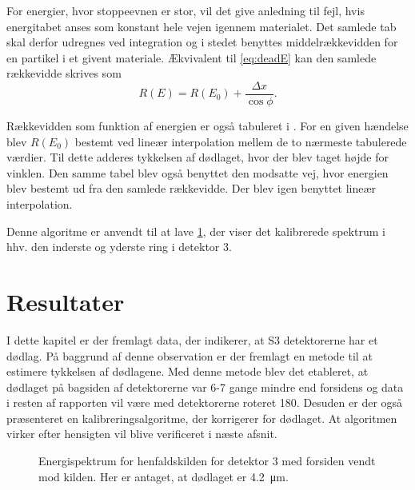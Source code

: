 For energier, hvor stoppeevnen er stor, vil det give anledning til fejl, hvis energitabet anses som
konstant hele vejen igennem materialet. Det samlede tab skal derfor udregnes ved integration og
i stedet benyttes middelrækkevidden for en partikel i et givent materiale. Ækvivalent til
\cref{eq:deadE} kan den samlede rækkevidde skrives som
\begin{equation}
  \label{eq:deadR}
  R(E) = R(E_{0}) + \frac{\Delta x}{\cos \phi} .
\end{equation}

Rækkevidden som funktion af energien er også tabuleret i \cite{Ziegler}. For en given hændelse
blev $R(E_{0})$ bestemt ved lineær interpolation mellem de to nærmeste tabulerede værdier. Til dette
adderes tykkelsen af dødlaget, hvor der blev taget højde for vinklen. Den samme tabel blev også
benyttet den modsatte vej, hvor energien blev bestemt ud fra den samlede rækkevidde. Der blev igen
benyttet lineær interpolation.

Denne algoritme er anvendt til at lave \cref{fig:kalib-spec}, der viser det kalibrerede spektrum i
hhv. den inderste og yderste ring i detektor 3. 

\section{Resultater}
\label{sec:kalib-resultater}

I dette kapitel er der fremlagt data, der indikerer, at S3 detektorerne har et dødlag. På baggrund
af denne observation er der fremlagt en metode til at estimere tykkelsen af dødlagene. Med denne
metode blev det etableret, at dødlaget på bagsiden af detektorerne var 6-7 gange mindre end
forsidens og data i resten af rapporten vil være med detektorerne roteret 180\degree. Desuden er
der også præsenteret en kalibreringsalgoritme, der korrigerer for dødlaget. At algoritmen virker
efter hensigten vil blive verificeret i næste afsnit.

\begin{figure}[hb]
  \centering
  \vspace{-0.2cm}
  \hfill
  \caption{Energispektrum for henfaldskilden for detektor 3 med forsiden vendt mod kilden. Her er
    antaget, at dødlaget er \SI{4.2}{\um}.}
  \label{fig:kalib-spec}
  \vspace{-4cm}
\end{figure}









